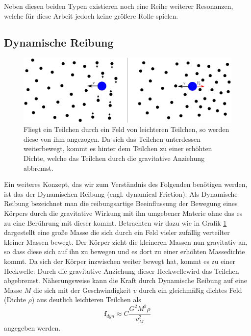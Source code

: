 \documentclass[12pt,a4paper,twoside]{article}
\begin{document}
Neben diesen beiden Typen existieren noch eine Reihe weiterer Resonanzen, welche für diese Arbeit jedoch keine größere Rolle spielen. %

\subsection{Dynamische Reibung}
\begin{figure}
\centering
\includegraphics[scale=0.4]{img/dynamischeReibung}
\caption{Fliegt ein Teilchen durch ein Feld von leichteren Teilchen, so werden diese von ihm angezogen. Da sich das Teilchen unterdessen weiterbewegt, kommt es hinter dem Teilchen zu einer erhöhten Dichte, welche das Teilchen durch die gravitative Anziehung abbremst.}
\label{fig:df}
\end{figure}
Ein weiteres Konzept, das wir zum Verständnis des Folgenden benötigen werden, ist das der Dynamischen Reibung (engl. dynamical Friction). Als Dynamische Reibung bezeichnet man die reibungsartige Beeinflussung der Bewegung eines Körpers durch die gravitative Wirkung mit ihn umgebener Materie ohne das es zu eine Berührung mit dieser kommt.
Betrachten wir dazu wie in Grafik \ref{fig:df} dargestellt eine große Masse die sich durch ein Feld vieler zufällig verteilter kleiner Massen bewegt. Der Körper zieht die kleineren Massen nun gravitativ an, so dass diese sich auf ihn zu bewegen und es dort zu einer erhöhten Massedichte kommt. Da sich der Körper inzwischen weiter bewegt hat, kommt es zu einer \glqq Heckwelle\grqq. Durch die gravitative Anziehung dieser \glqq Heckwelle\grqq wird das Teilchen abgebremst.
Näherungsweise kann die Kraft durch Dynamische Reibung auf eine Masse $M$ die sich mit der Geschwindigkeit $v$ durch ein gleichmäßig dichtes Feld (Dichte $\rho$) aus deutlich leichteren Teilchen als
\begin{equation}\label{eq:df}
\textbf{f}_{dyn} \approx C \frac{G^2 M^2 \rho}{v^2_M}
\end{equation}
angegeben werden.
\end{document}

